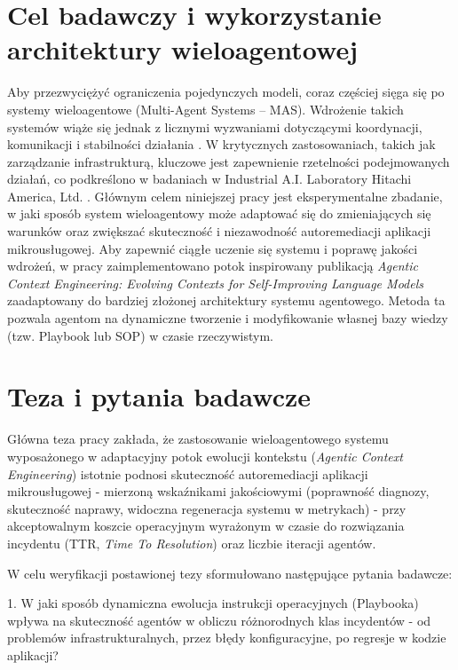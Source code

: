 \section{Cel badawczy i wykorzystanie architektury wieloagentowej}
Aby przezwyciężyć ograniczenia pojedynczych modeli, coraz częściej sięga się po systemy wieloagentowe (Multi-Agent Systems – MAS). 
Wdrożenie takich systemów wiąże się jednak z licznymi wyzwaniami dotyczącymi koordynacji, komunikacji i stabilności działania \cite{han2024llm_multiagent_challenges}. 
W krytycznych zastosowaniach, takich jak zarządzanie infrastrukturą, kluczowe jest zapewnienie rzetelności podejmowanych działań, co podkreślono w badaniach w Industrial A.I. Laboratory Hitachi America, Ltd. \cite{lee2025reliable_multiagent_llm}. Głównym celem niniejszej pracy jest eksperymentalne zbadanie, w jaki sposób system wieloagentowy może adaptować się do zmieniających się warunków oraz zwiększać skuteczność i niezawodność autoremediacji aplikacji mikrousługowej. Aby zapewnić ciągłe uczenie się systemu i poprawę jakości wdrożeń, w pracy zaimplementowano potok inspirowany publikacją \textit{Agentic Context Engineering: Evolving Contexts for Self-Improving Language Models} \cite{zhang2025agentic_context_engineering} zaadaptowany do bardziej złożonej architektury systemu agentowego. Metoda ta pozwala agentom na dynamiczne tworzenie i modyfikowanie własnej bazy wiedzy (tzw. Playbook lub SOP) w czasie rzeczywistym.

\section{Teza i pytania badawcze}
Główna teza pracy zakłada, że zastosowanie wieloagentowego systemu wyposażonego w adaptacyjny potok ewolucji kontekstu (\textit{Agentic Context Engineering}) istotnie podnosi skuteczność autoremediacji aplikacji mikrousługowej - mierzoną wskaźnikami jakościowymi (poprawność diagnozy, skuteczność naprawy, widoczna regeneracja systemu w metrykach) - przy akceptowalnym koszcie operacyjnym wyrażonym w czasie do rozwiązania incydentu (TTR, \textit{Time To Resolution}) oraz liczbie iteracji agentów.

W celu weryfikacji postawionej tezy sformułowano następujące pytania badawcze:

1. W jaki sposób dynamiczna ewolucja instrukcji operacyjnych (Playbooka) wpływa na skuteczność agentów w obliczu różnorodnych klas incydentów - od problemów infrastrukturalnych, przez błędy konfiguracyjne, po regresje w kodzie aplikacji?

